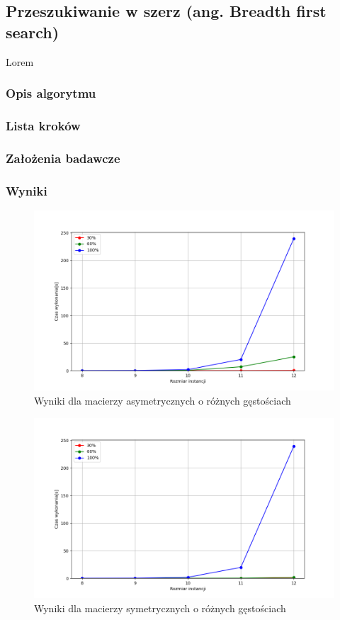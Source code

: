 \documentclass{article}
\begin{document}
  \subsection{Przeszukiwanie w szerz (ang. Breadth first search)}
  Lorem
  \subsubsection{Opis algorytmu}
  \subsubsection{Lista kroków}
  \subsubsection{Założenia badawcze}
  \subsubsection{Wyniki}
  
  \FloatBarrier

  \begin{figure}[ht]
    \centering
    \includegraphics[width=\textwidth]{src/plots/asymbfsresoult.png}
    \caption{Wyniki dla macierzy asymetrycznych o różnych gęstościach}
    \label{fig:asm_bfs}
  \end{figure}    
  \begin{figure}[ht]
    \centering
    \includegraphics[width=\textwidth]{src/plots/symbfsresoult.png}
    \caption{Wyniki dla macierzy symetrycznych o różnych gęstościach}
    \label{fig:sm_bfs}
  \end{figure}
  \FloatBarrier
\end{document}
